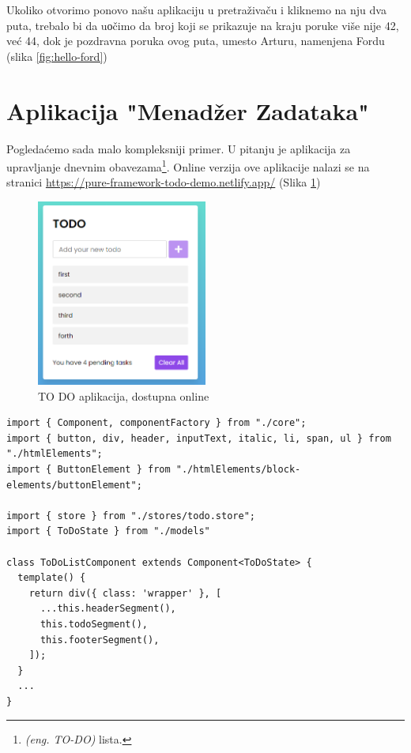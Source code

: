 \documentclass[12pt,oneside]{memoir}
\newcommand{\code}[1]{\colorbox{codegray}{\texttt{\scalebox{0.9}{#1}}}}%
\begin{document}
Ukoliko otvorimo ponovo našu aplikaciju u pretraživaču i kliknemo na nju dva puta,
trebalo bi da uоčimo da broj koji se prikazuje na kraju poruke više nije 42, već 44,
dok je pozdravna poruka ovog puta, umesto Arturu, namenjena Fordu (slika \ref{fig:hello-ford})

\section{ Aplikacija "Menadžer Zadataka"}
Pogledaćemo sada malo kompleksniji primer.
U pitanju je aplikacija za upravljanje dnevnim obavezama\footnote{\emph{(eng. TO-DO)} lista.}.
Online verzija ove aplikacije nalazi se na stranici \url{https://pure-framework-todo-demo.netlify.app/}
(Slika \ref{fig:todo-app})

\begin{figure}[!ht]
  \centering
  \includegraphics[width=0.5\textwidth]{slike/todo-app-online.PNG}
  \caption{TO DO aplikacija, dostupna online}
  \label{fig:todo-app}
\end{figure}
\pagebreak

\begin{lstlisting}[style=jsStyle, firstnumber=6, caption={Fajl \code{App.ts} nakon dodate funkcionalnosti},label=file:app.ts:2]
import { Component, componentFactory } from "./core";
import { button, div, header, inputText, italic, li, span, ul } from "./htmlElements";
import { ButtonElement } from "./htmlElements/block-elements/buttonElement";

import { store } from "./stores/todo.store";
import { ToDoState } from "./models"

class ToDoListComponent extends Component<ToDoState> {
  template() {
    return div({ class: 'wrapper' }, [
      ...this.headerSegment(),
      this.todoSegment(),
      this.footerSegment(),
    ]);
  }
  ...
}
  \end{lstlisting}
\end{document}

